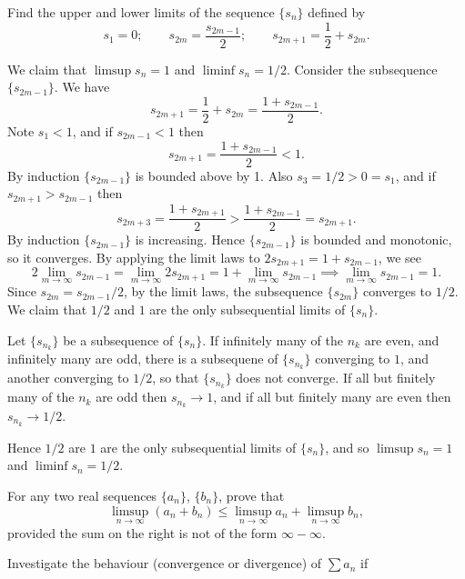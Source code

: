 \begin{questions}
  \question Find the upper and lower limits of the sequence $\{s_n\}$ defined by
  \[ s_1 = 0; \qquad s_{2m} = \frac{s_{2m-1}}{2}; \qquad s_{2m+1} = \frac{1}{2} + s_{2m}. \]
  \begin{solution}
    We claim that $\limsup s_n = 1$ and $\liminf s_n=1/2$. Consider the subsequence $\{s_{2m-1}\}$. We have
    \[ s_{2m+1} = \frac{1}{2} + s_{2m} = \frac{1+s_{2m-1}}{2}. \]
    Note $s_1<1$, and if $s_{2m-1}<1$ then
    \[ s_{2m+1} = \frac{1+s_{2m-1}}{2} < 1. \]
    By induction $\{s_{2m-1}\}$ is bounded above by 1. Also $s_3=1/2>0=s_1$, and if $s_{2m+1}>s_{2m-1}$ then
    \[ s_{2m+3} = \frac{1+s_{2m+1}}{2} > \frac{1+s_{2m-1}}{2} = s_{2m+1}. \]
    By induction $\{s_{2m-1}\}$ is increasing. Hence $\{s_{2m-1}\}$ is bounded and monotonic, so it converges. By applying the limit laws to $2s_{2m+1}=1+s_{2m-1}$, we see
    \[ 2\lim_{m\to\infty} s_{2m-1} = \lim_{m\to\infty} 2s_{2m+1} = 1 + \lim_{m\to\infty} s_{2m-1} \implies \lim_{m\to\infty} s_{2m-1} = 1. \]
    Since $s_{2m}=s_{2m-1}/2$, by the limit laws, the subsequence $\{s_{2m}\}$ converges to $1/2$. We claim that $1/2$ and $1$ are the only subsequential limits of $\{s_n\}$.

    Let $\{s_{n_k}\}$ be a subsequence of $\{s_n\}$. If infinitely many of the $n_k$ are even, and infinitely many are odd, there is a subsequene of $\{s_{n_k}\}$ converging to $1$, and another converging to $1/2$, so that $\{s_{n_k}\}$ does not converge. If all but finitely many of the $n_k$ are odd then $s_{n_k}\to1$, and if all but finitely many are even then $s_{n_k}\to1/2$.

    Hence $1/2$ are $1$ are the only subsequential limits of $\{s_n\}$, and so $\limsup s_n=1$ and $\liminf s_n=1/2$.
  \end{solution}

  \question For any two real sequences $\{a_n\}$, $\{b_n\}$, prove that
  \[ \limsup_{n\to\infty} (a_n+b_n) \leq \limsup_{n\to\infty} a_n + \limsup_{n\to\infty} b_n, \]
  provided the sum on the right is not of the form $\infty-\infty$.

  \question Investigate the behaviour (convergence or divergence) of $\sum a_n$ if
\end{questions}
